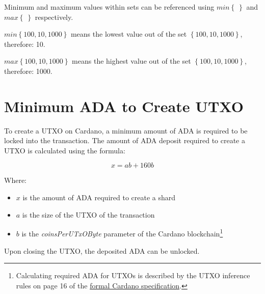 \documentclass{article}
\begin{document}
\begin{sloppypar}
Minimum and maximum values within sets can be referenced using
\(min\left\{ \  \right\}\) and \(max\left\{ \  \right\}\) respectively.

\(min\left\{ 100,10,1000 \right\}\) means the lowest value out of the
set \(\left\{ 100,10,1000 \right\}\), therefore: 10.

\(max\left\{ 100,10,1000 \right\}\) means the highest value out of the
set \(\left\{ 100,10,1000 \right\}\), therefore: 1000.

\filbreak

\hypertarget{minimum-ada-to-create-utxo}{%
\section{Minimum ADA to Create UTXO}\label{minimum-ada-to-create-utxo}}

To create a UTXO on Cardano, a minimum amount of ADA is required to be
locked into the transaction. The amount of ADA deposit required to
create a UTXO is calculated using the formula:

\[x = ab + 160b\]

Where:

\begin{itemize}
\item
  \(x\) is the amount of ADA required to create a shard
\item
  \(a\) is the size of the UTXO of the transaction
\item
  \(b\) is the \emph{coinsPerUTxOByte} parameter of the Cardano
  blockchain\footnote{Calculating required ADA for UTXOs is described by
    the UTXO inference rules on page 16 of the
    \href{https://hydra.iohk.io/build/17586760/download/1/babbage-changes.pdf}{formal
    Cardano specification}.}
\end{itemize}

Upon closing the UTXO, the deposited ADA can be unlocked.

\end{sloppypar}
\end{document}
